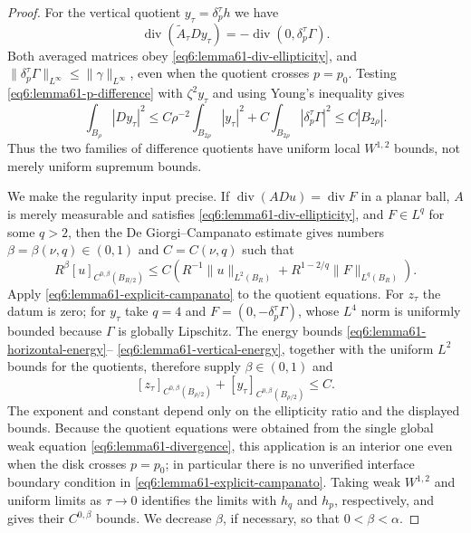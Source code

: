 \documentclass[11pt,reqno]{amsart}
\numberwithin{equation}{section}
\theoremstyle{definition}
\theoremstyle{remark}
\begin{document}
\begin{proof}
For the vertical quotient $y_\tau=\delta_p^\tau h$ we have
\begin{equation}\label{eq6:lemma61-p-difference}
 \operatorname{div}(\widetilde A_\tau Dy_\tau)
 =-\operatorname{div}
 \left(0,\delta_p^\tau\Gamma\right).
\end{equation}
Both averaged matrices obey \eqref{eq6:lemma61-div-ellipticity}, and
$\|\delta_p^\tau\Gamma\|_{L^\infty}\le\|\gamma\|_{L^\infty}$,
even when the quotient crosses $p=p_0$.  Testing
\eqref{eq6:lemma61-p-difference} with $\zeta^2y_\tau$ and using
Young's inequality gives
\begin{equation}\label{eq6:lemma61-vertical-energy}
 \int_{B_\rho}|Dy_\tau|^2
 \le C\rho^{-2}\int_{B_{2\rho}}|y_\tau|^2
   +C\int_{B_{2\rho}}|\delta_p^\tau\Gamma|^2
 \le C|B_{2\rho}|.
\end{equation}
Thus the two families of difference quotients have uniform local
$W^{1,2}$ bounds, not merely uniform supremum bounds.

We make the regularity input precise.  If
$\operatorname{div}(A Du)=\operatorname{div}F$ in a planar ball,
$A$ is merely measurable and satisfies
\eqref{eq6:lemma61-div-ellipticity}, and $F\in L^q$ for some
$q>2$, then the De Giorgi--Campanato estimate
\cite[Theorem 8.24]{GilbargT} gives numbers
$\beta=\beta(\nu,q)\in(0,1)$ and $C=C(\nu,q)$ such that
\begin{equation}\label{eq6:lemma61-explicit-campanato}
 R^\beta[u]_{C^{0,\beta}(B_{R/2})}
 \le C\left(
 R^{-1}\|u\|_{L^2(B_R)}
 +R^{1-2/q}\|F\|_{L^q(B_R)}
 \right).
\end{equation}
Apply \eqref{eq6:lemma61-explicit-campanato} to the quotient equations.
For $z_\tau$ the datum is zero; for $y_\tau$ take $q=4$ and
$F=(0,-\delta_p^\tau\Gamma)$, whose $L^4$ norm is uniformly
bounded because $\Gamma$ is globally Lipschitz.  The energy bounds
\eqref{eq6:lemma61-horizontal-energy}--
\eqref{eq6:lemma61-vertical-energy}, together with the uniform
$L^2$ bounds for the quotients, therefore supply
$\beta\in(0,1)$ and
\begin{equation}\label{eq6:lemma61-quotient-campanato}
 [z_\tau]_{C^{0,\beta}(B_{\rho/2})}
 +[y_\tau]_{C^{0,\beta}(B_{\rho/2})}\le C.
\end{equation}
The exponent and constant depend only on the ellipticity ratio and
the displayed bounds.  Because the quotient equations were obtained
from the single global weak equation
\eqref{eq6:lemma61-divergence}, this application is an interior one
even when the disk crosses $p=p_0$; in particular there is no
unverified interface boundary condition in
\eqref{eq6:lemma61-explicit-campanato}.  Taking weak $W^{1,2}$ and
uniform limits as $\tau\to0$ identifies the limits with $h_q$ and
$h_p$, respectively, and gives their $C^{0,\beta}$ bounds.  We
decrease $\beta$, if necessary, so that $0<\beta<\alpha$.


\end{proof}
\end{document}

